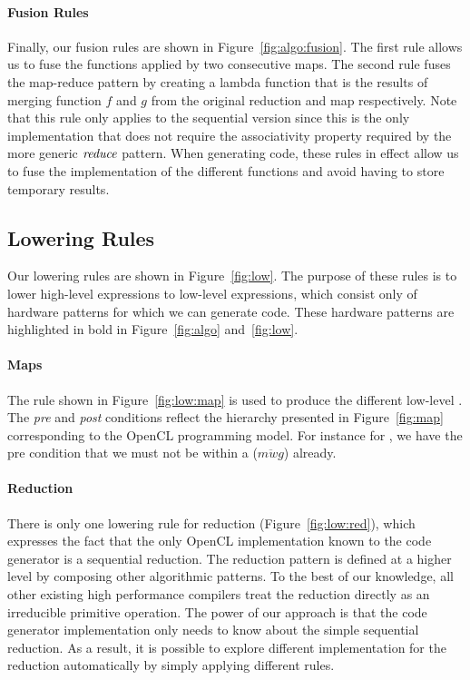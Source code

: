 \paragraph{Fusion Rules}
Finally, our fusion rules are shown in Figure~\ref{fig:algo:fusion}.
The first rule allows us to fuse the functions applied by two consecutive maps.
The second rule fuses the map-reduce pattern by creating a lambda function that is the results of merging function $f$ and $g$ from the original reduction and map respectively.
Note that this rule only applies to the sequential version since this is the only implementation that does not require the associativity property required by the more generic $\textit{reduce}$ pattern.
When generating code, these rules in effect allow us to fuse the implementation of the different functions and avoid having to store temporary results.





\subsection{Lowering Rules}

Our lowering rules are shown in Figure~\ref{fig:low}.
The purpose of these rules is to lower high-level expressions to low-level expressions, which consist only of hardware patterns for which we can generate code.
These hardware patterns are highlighted in bold in Figure~\ref{fig:algo} and~\ref{fig:low}.

\paragraph{Maps}
The rule shown in Figure~\ref{fig:low:map} is used to produce the different low-level .
The \emph{pre} and \emph{post} conditions reflect the hierarchy presented in Figure~\ref{fig:map} corresponding to the OpenCL programming model.
For instance for , we have the pre condition that we must not be within a  ($\overline{mwg}$) already.

\paragraph{Reduction}
There is only one lowering rule for reduction (Figure~\ref{fig:low:red}), which expresses the fact that the only OpenCL implementation known to the code generator is a sequential reduction.
The reduction pattern is defined at a higher level by composing other algorithmic patterns.
To the best of our knowledge, all other existing high performance compilers treat the reduction directly as an irreducible primitive operation.
The power of our approach is that the code generator implementation only needs to know about the simple sequential reduction.
As a result, it is possible to explore different implementation for the reduction automatically by simply applying different rules.

